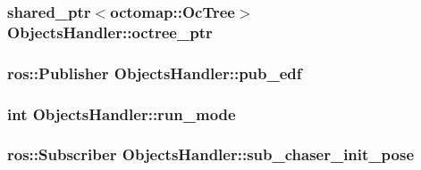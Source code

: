 \subsubsection[{\texorpdfstring{octree\+\_\+ptr}{octree_ptr}}]{\setlength{\rightskip}{0pt plus 5cm}shared\+\_\+ptr$<$octomap\+::\+Oc\+Tree$>$ Objects\+Handler\+::octree\+\_\+ptr\hspace{0.3cm}{\ttfamily [private]}}\hypertarget{class_objects_handler_a76ad7ca7513755408c02dd36dea94c6e}{}\label{class_objects_handler_a76ad7ca7513755408c02dd36dea94c6e}
\subsubsection[{\texorpdfstring{pub\+\_\+edf}{pub_edf}}]{\setlength{\rightskip}{0pt plus 5cm}ros\+::\+Publisher Objects\+Handler\+::pub\+\_\+edf\hspace{0.3cm}{\ttfamily [private]}}\hypertarget{class_objects_handler_a86a1f98983b533f77bf17867affb5251}{}\label{class_objects_handler_a86a1f98983b533f77bf17867affb5251}
\subsubsection[{\texorpdfstring{run\+\_\+mode}{run_mode}}]{\setlength{\rightskip}{0pt plus 5cm}int Objects\+Handler\+::run\+\_\+mode\hspace{0.3cm}{\ttfamily [private]}}\hypertarget{class_objects_handler_a95908d5b00f62b629dc7f20acb714292}{}\label{class_objects_handler_a95908d5b00f62b629dc7f20acb714292}
\subsubsection[{\texorpdfstring{sub\+\_\+chaser\+\_\+init\+\_\+pose}{sub_chaser_init_pose}}]{\setlength{\rightskip}{0pt plus 5cm}ros\+::\+Subscriber Objects\+Handler\+::sub\+\_\+chaser\+\_\+init\+\_\+pose\hspace{0.3cm}{\ttfamily [private]}}\hypertarget{class_objects_handler_a9a2e098b85260b71c88b81dadd6ca58a}{}\label{class_objects_handler_a9a2e098b85260b71c88b81dadd6ca58a}
